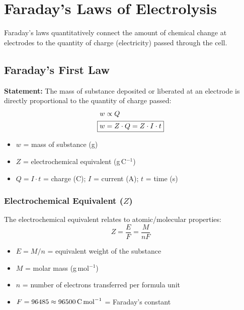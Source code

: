 \section{Faraday's Laws of Electrolysis}

Faraday's laws quantitatively connect the amount of chemical change at electrodes to the quantity of charge (electricity) passed through the cell.

\subsection{Faraday's First Law}

\begin{conceptbox}
\textbf{Statement:} The mass of substance deposited or liberated at an electrode is directly proportional to the quantity of charge passed:
\begin{align}
    w &\propto Q \nonumber\\
    \Aboxed{w &= Z \cdot Q = Z \cdot I \cdot t}
\end{align}
\begin{itemize}
    \item $w$ = mass of substance (g)
    \item $Z$ = electrochemical equivalent (g\,C$^{-1}$)
    \item $Q = I \cdot t$ = charge (C); $I$ = current (A); $t$ = time (s)
\end{itemize}
\end{conceptbox}

\subsubsection{Electrochemical Equivalent ($Z$)}

The electrochemical equivalent relates to atomic/molecular properties:
\begin{equation}
    \boxed{Z = \frac{E}{F} = \frac{M}{nF}}
\end{equation}
\begin{itemize}
    \item $E = M/n$ = equivalent weight of the substance
    \item $M$ = molar mass (g\,mol$^{-1}$)
    \item $n$ = number of electrons transferred per formula unit
    \item $F = 96485 \approx 96500\,\text{C\,mol}^{-1}$ = Faraday's constant
\end{itemize}

